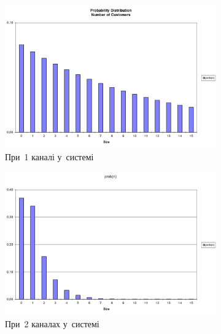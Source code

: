 \documentclass[
  a4paper,
  oneside,
  BCOR = 10mm,
  DIV = 12,
  12pt,
  headings = normal,
]{scrartcl}
\newlength{\gridunitwidth}
\begin{document}
      \begin{figure}[!htbp]
        \begin{subfigure}[b]{6 \gridunitwidth - 0.5 \gridunitwidth}
          \includegraphics[width = \columnwidth]{./assets/01-01.png}
          \caption{При~1 каналі у~системі}
          \label{subfig:size-dist-chart-01}
        \end{subfigure}%
        \hspace{1 \gridunitwidth}%
        \begin{subfigure}[b]{6 \gridunitwidth - 0.5 \gridunitwidth}
          \includegraphics[width = \columnwidth]{./assets/02-01.png}
          \caption{При~2 каналах у~системі}
          \label{subfig:size-dist-chart-02}
        \end{subfigure}
        \begin{subfigure}[b]{6 \gridunitwidth - 0.5 \gridunitwidth}

\end{subfigure}
\end{figure}
\end{document}
